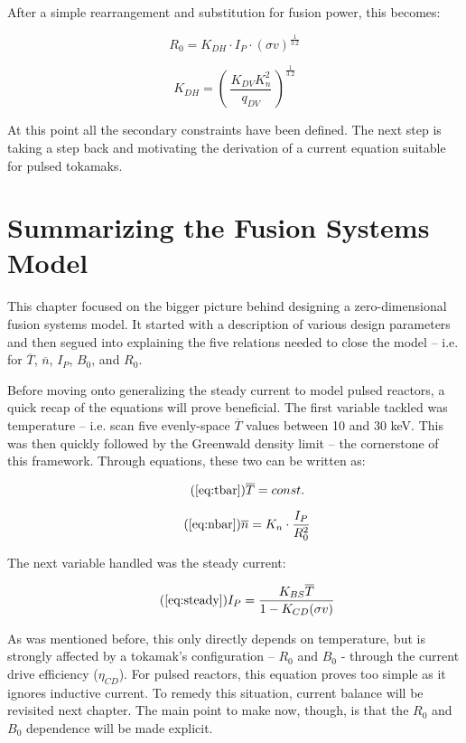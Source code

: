 After a simple rearrangement and substitution for fusion power, this becomes:

\begin{equation}
	R_0 = K_{DH} \cdot I_P \cdot (\sigma v)^ {\frac{1}{3.2}} 
\end{equation}

\begin{equation}
	K_{DH} = \left( \, \frac{ K_{DV} K_n^2 }{ q_{DV} } \, \right) ^ {\frac{1}{3.2}}
\end{equation}

At this point all the secondary constraints have been defined. The next step is taking a step back and motivating the derivation of a current equation suitable for pulsed tokamaks.

\section{Summarizing the Fusion Systems Model}

This chapter focused on the bigger picture behind designing a zero-dimensional fusion systems model. It started with a description of various design parameters and then segued into explaining the five relations needed to close the model -- i.e. for $\overline T$, $\overline n$, $I_P$, $B_0$, and $R_0$.

Before moving onto generalizing the steady current to model pulsed reactors, a quick recap of the equations will prove beneficial. The first variable tackled was temperature -- i.e. scan five evenly-space $\overline T$ values between 10 and 30 keV. This was then quickly followed by the Greenwald density limit -- the cornerstone of this framework. Through equations, these two can be written as:

\begin{equation}
	\tag{\ref{eq:tbar}}
	\overline T = const.
\end{equation}

\begin{equation}
	\tag{\ref{eq:nbar}}
	\overline n = K_n \cdot \frac{I_P}{R_0^2}
\end{equation}

The next variable handled was the steady current:

\begin{equation}
	\tag{\ref{eq:steady}}
	I_P = \frac{K_{BS} \overline T}{1 - K_{CD} ( \sigma v ) }
\end{equation}

As was mentioned before, this only directly depends on temperature, but is strongly affected by a tokamak's configuration -- $R_0$ and $B_0$ - through the current drive efficiency ($\eta_{CD}$). For pulsed reactors, this equation proves too simple as it ignores inductive current. To remedy this situation, current balance will be revisited next chapter. The main point to make now, though, is that the $R_0$ and $B_0$ dependence will be made explicit.

